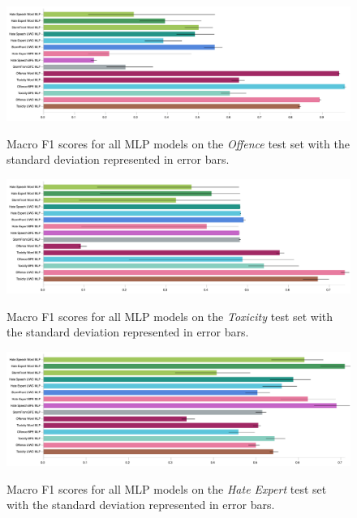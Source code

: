 \begin{figure}
\begin{minipage}{\textwidth}
    \centering
    \includegraphics[width=\textwidth]{all_mlp_davidson_test.pdf}
    \caption{Macro F1 scores for all MLP models on the \textit{Offence} test set with the standard deviation represented in error bars.}
    \label{fig:davidson_mlp_test}
  \vfill
    \includegraphics[width=\textwidth]{all_mlp_wulczyn_test.pdf}
    \caption{Macro F1 scores for all MLP models on the \textit{Toxicity} test set with the standard deviation represented in error bars.}
    \label{fig:wulczyn_mlp_test}
  \vfill
    \includegraphics[width=\textwidth]{all_mlp_waseem_test.pdf}
    \caption{Macro F1 scores for all MLP models on the \textit{Hate Expert} test set with the standard deviation represented in error bars.}
    \label{fig:waseem_mlp_test}
\end{minipage}
\end{figure}

